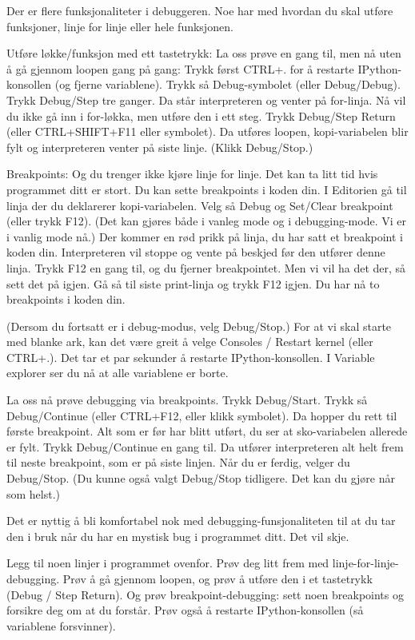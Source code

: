 Der er flere funksjonaliteter i debuggeren. Noe har med hvordan du skal utføre funksjoner, linje for linje eller hele funksjonen.

Utføre løkke/funksjon med ett tastetrykk: 
La oss prøve en gang til, men nå uten å gå gjennom loopen gang på gang:
Trykk først CTRL+. for å restarte IPython-konsollen (og fjerne variablene).
Trykk så Debug-symbolet (eller Debug/Debug).
Trykk Debug/Step tre ganger.
Da står interpreteren og venter på for-linja. 
Nå vil du ikke gå inn i for-løkka, men utføre den i ett steg.
Trykk Debug/Step Return (eller CTRL+SHIFT+F11 eller symbolet).
Da utføres loopen, kopi-variabelen blir fylt og interpreteren venter på siste linje.
(Klikk Debug/Stop.)


Breakpoints: 
Og du trenger ikke kjøre linje for linje.
Det kan ta litt tid hvis programmet ditt er stort. 
Du kan sette breakpoints i koden din.
I Editorien gå til linja der du deklarerer kopi-variabelen.
Velg så Debug og Set/Clear breakpoint (eller trykk F12).
(Det kan gjøres både i vanleg mode og i debugging-mode. Vi er i vanlig mode nå.) 
Der kommer en rød prikk på linja, du har satt et breakpoint i koden din.
Interpreteren vil stoppe og vente på beskjed før den utfører denne linja. 
Trykk F12 en gang til, og du fjerner breakpointet.
Men vi vil ha det der, så sett det på igjen.
Gå så til siste print-linja og trykk F12 igjen.
Du har nå to breakpoints i koden din.

(Dersom du fortsatt er i debug-modus, velg Debug/Stop.)
For at vi skal starte med blanke ark, kan det være greit å velge
Consoles / Restart kernel (eller CTRL+.).
Det tar et par sekunder å restarte IPython-konsollen.
I Variable explorer ser du nå at alle variablene er borte.

La oss nå prøve debugging via breakpoints.
Trykk Debug/Start.
Trykk så Debug/Continue (eller CTRL+F12, eller klikk symbolet). 
Da hopper du rett til første breakpoint. 
Alt som er før har blitt utført, du ser at sko-variabelen allerede er fylt.
Trykk Debug/Continue en gang til.
Da utfører interpreteren alt helt frem til neste breakpoint, som er på siste linjen.
Når du er ferdig, velger du Debug/Stop.
(Du kunne også valgt Debug/Stop tidligere. Det kan du gjøre når som helst.) 

Det er nyttig å bli komfortabel nok med debugging-funsjonaliteten til at du
tar den i bruk når du har en mystisk bug i programmet ditt.
Det vil skje. 

\begin{exercise}
Legg til noen linjer i programmet ovenfor. Prøv deg litt frem med linje-for-linje-debugging. Prøv å gå gjennom loopen, og prøv å utføre den i et tastetrykk (Debug / Step Return). Og prøv breakpoint-debugging: sett noen breakpoints og forsikre deg om at du forstår. Prøv også å restarte IPython-konsollen (så variablene forsvinner). 
\end{exercise}

